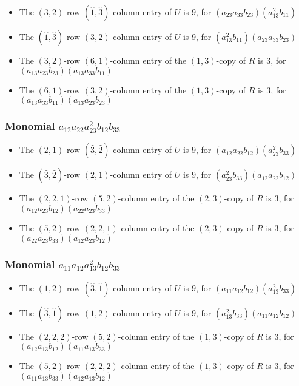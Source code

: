 \documentclass{article}
\begin{document}
\begin{itemize}
\item The $ \left(3, 2\right) $-row $ (\hat{1}, \hat{3}) $-column entry of $U$ is $ 9 $, for $( a_{23} a_{33} b_{23} )( a_{13}^{2} b_{11} )$ 
\item The $(\hat{1}, \hat{3})$-row $ \left(3, 2\right) $-column entry of $U$ is $ 9 $, for $( a_{13}^{2} b_{11} )( a_{23} a_{33} b_{23} )$ 
\item The $(3, 2)$-row $(6, 1)$-column entry of the $ \left(1, 3\right) $-copy of $R$ is $ 3 $, for $( a_{13} a_{23} b_{23} )( a_{13} a_{33} b_{11} )$ 
\item The $(6, 1)$-row $(3, 2)$-column entry of the $ \left(1, 3\right) $-copy of $R$ is $ 3 $, for $( a_{13} a_{33} b_{11} )( a_{13} a_{23} b_{23} )$ 
\end{itemize}
\subsubsection{Monomial $ a_{12} a_{22} a_{23}^{2} b_{12} b_{33} $}

\begin{itemize}
\item The $ \left(2, 1\right) $-row $ (\hat{3}, \hat{2}) $-column entry of $U$ is $ 9 $, for $( a_{12} a_{22} b_{12} )( a_{23}^{2} b_{33} )$ 
\item The $(\hat{3}, \hat{2})$-row $ \left(2, 1\right) $-column entry of $U$ is $ 9 $, for $( a_{23}^{2} b_{33} )( a_{12} a_{22} b_{12} )$ 
\item The $(2, 2, 1)$-row $(5, 2)$-column entry of the $ \left(2, 3\right) $-copy of $R$ is $ 3 $, for $( a_{12} a_{23} b_{12} )( a_{22} a_{23} b_{33} )$ 
\item The $(5, 2)$-row $(2, 2, 1)$-column entry of the $ \left(2, 3\right) $-copy of $R$ is $ 3 $, for $( a_{22} a_{23} b_{33} )( a_{12} a_{23} b_{12} )$ 
\end{itemize}
\subsubsection{Monomial $ a_{11} a_{12} a_{13}^{2} b_{12} b_{33} $}

\begin{itemize}
\item The $ \left(1, 2\right) $-row $ (\hat{3}, \hat{1}) $-column entry of $U$ is $ 9 $, for $( a_{11} a_{12} b_{12} )( a_{13}^{2} b_{33} )$ 
\item The $(\hat{3}, \hat{1})$-row $ \left(1, 2\right) $-column entry of $U$ is $ 9 $, for $( a_{13}^{2} b_{33} )( a_{11} a_{12} b_{12} )$ 
\item The $(2, 2, 2)$-row $(5, 2)$-column entry of the $ \left(1, 3\right) $-copy of $R$ is $ 3 $, for $( a_{12} a_{13} b_{12} )( a_{11} a_{13} b_{33} )$ 
\item The $(5, 2)$-row $(2, 2, 2)$-column entry of the $ \left(1, 3\right) $-copy of $R$ is $ 3 $, for $( a_{11} a_{13} b_{33} )( a_{12} a_{13} b_{12} )$ 
\end{itemize}
\end{document}
